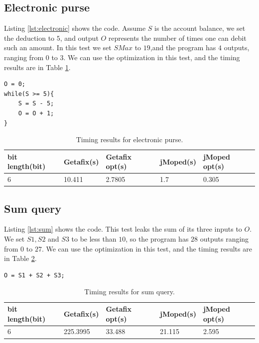 \subsection{Electronic purse}
Listing \ref{lst:electronic} shows the code. Assume $S$ is the account balance, we set the deduction to $5$, and output $O$ represents the number of times one can debit such an amount.  In this test we set $SMax$ to $19$,and the program has $4$ outputs, ranging from $0$ to $3$. We can use the optimization in this test, and the timing results are in Table \ref{tbl:electronic}.

\lstset{language=C}  
\begin{lstlisting}[float=h, caption={Electronic purse test program.},label=lst:electronic]
O = 0;
while(S >= 5){
	S = S - 5;
	O = O + 1;
}
\end{lstlisting}

\begin{table}[htbp]
\begin{tabular}{|l|l|l|l|l|}
\hline
{bit length(bit)} & Getafix(s) & {Getafix opt(s)} & jMoped(s) & {jMoped opt(s)} \\ \hline
{6} & {10.411} & {2.7805} & {1.7} & {0.305} \\ \hline
\end{tabular}
\caption{Timing results for electronic purse.}
\label{tbl:electronic}
\end{table}

\subsection{Sum query}
Listing \ref{lst:sum} shows the code. This test leaks the sum of its three inputs to $O$. We set $S1, S2$ and $S3$ to be less than $10$, so the program has $28$ outputs ranging from $0$ to $27$. We can use the optimization in this test, and the timing results are in Table \ref{tbl:sum}.

\lstset{language=C}  
\begin{lstlisting}[float=h, caption={Sum query test program.},label=lst:sum]
O = S1 + S2 + S3;
\end{lstlisting}

\begin{table}[htbp]
\begin{tabular}{|l|l|l|l|l|}
\hline
{bit length(bit)} & Getafix(s) & {Getafix opt(s)} & jMoped(s) & {jMoped opt(s)} \\ \hline
6 & 225.3995 & 33.488 & 21.115 & 2.595	\\ \hline
\end{tabular}
\caption{Timing results for sum query.}
\label{tbl:sum}
\end{table}

